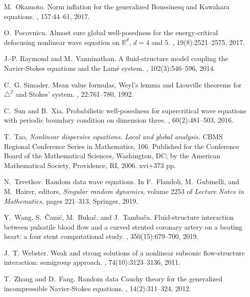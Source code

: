 \documentclass[letterpaper, 11pt,  reqno]{amsart}
\newcommand{\1}{\hspace{0.5mm}\text{I}\hspace{0.2mm}}
\numberwithin{equation}{section}
\numberwithin{theorem}{section}
\begin{document}
\begin{thebibliography}{10}
M.~Okamoto.
\newblock Norm inflation for the generalized {B}oussinesq and {K}awahara
  equations.
, 157:44--61, 2017.

O.~Pocovnicu.
\newblock Almost sure global well-posedness for the energy-critical defocusing
  nonlinear wave equation on $\mathbb{R}^{d}$, $d = 4$ and $5$.
, 19(8):2521--2575, 2017.

J.-P. Raymond and M.~Vanninathan.
\newblock A fluid-structure model coupling the {N}avier-{S}tokes equations and
  the {L}am\'{e} system.
, 102(3):546--596, 2014.

C.~G. Simader.
\newblock Mean value formulas, {W}eyl's lemma and {L}iouville theorems for
  $\triangle^{2}$ and {S}tokes' system.
, 22:761--780, 1992.

C.~Sun and B.~Xia.
\newblock Probabilistic well-posedness for supercritical wave equations with
  periodic boundary condition on dimension three.
, 60(2):481--503, 2016.



T.~Tao, 
{\it Nonlinear dispersive equations.
Local and global analysis.} CBMS Regional Conference Series in Mathematics, 106. Published for the Conference Board of the Mathematical Sciences, Washington, DC; by the American Mathematical Society, Providence, RI, 2006. xvi+373 pp.


N.~Tzvetkov.
\newblock Random data wave equations.
\newblock In F.~Flandoli, M.~Gubinelli, and M.~Hairer, editors, {\em Singular
  random dynamics}, volume 2253 of {\em Lecture Notes in Mathematics}, pages
  221--313. Springer, 2019.

Y.~Wang, S.~{\v C}ani\'c, M.~Buka{\v c}, and J.~Tamba{\v c}a.
\newblock Fluid-structure interaction between pulsatile blood flow and a curved
  stented coronary artery on a beating heart: a four stent computational study.
, 350(15):679--700, 2019.

J.~T. Webster.
\newblock Weak and strong solutions of a nonlinear subsonic flow-structure interaction: semigroup approach.
, 74(10):3123--3136, 2011.

T.~Zhang and D.~Fang.
\newblock Random data {C}auchy theory for the generalized incompressible
  {N}avier-{S}tokes equations.
, 14(2):311--324, 2012.

\end{thebibliography}


%
%
\end{document}
